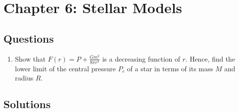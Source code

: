 \section{Chapter 6: Stellar Models}
\subsection{Questions}
\begin{enumerate}
    \item Show that $F(r) =P+\frac{Gm^2}{8\pi r^4}$ is a decreasing function of $r$. Hence, find the lower limit of the central pressure $P_c$ of a star in terms of its mass $M$ and radius $R$.
\end{enumerate}

\subsection{Solutions}
